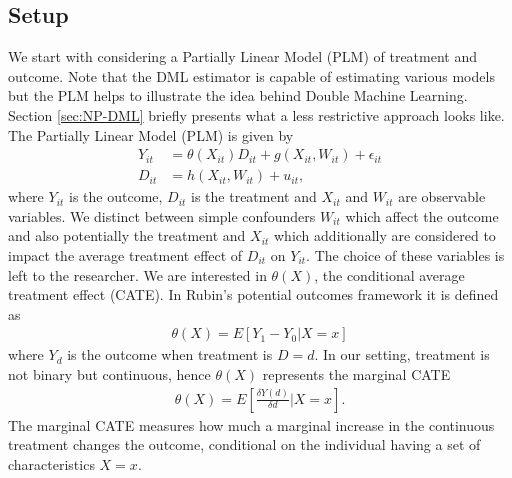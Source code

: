 \subsection{Setup} \label{sec:dml-idea}
We start with considering a Partially Linear Model (PLM) of treatment and outcome. Note that the DML estimator is capable of estimating various models but the PLM helps to illustrate the idea behind Double Machine Learning. Section \ref{sec:NP-DML} briefly presents what a less restrictive approach looks like. \\ 
The Partially Linear Model (PLM) is given by
\begin{align}
    Y_{it}&=\theta(X_{it})D_{it}+g(X_{it}, W_{it})+\epsilon_{it} \label{eq:plm1}\\
    D_{it}&=h(X_{it}, W_{it})+u_{it}, \label{eq:plm2}
\end{align}
where $Y_{it}$ is the outcome, $D_{it}$ is the treatment and $X_{it}$ and $W_{it}$ are observable variables. We distinct between simple confounders $W_{it}$ which affect the outcome and also potentially the treatment and $X_{it}$ which additionally are considered to impact the average treatment effect of $D_{it}$ on $Y_{it}$. The choice of these variables is left to the researcher. We are interested in $\theta(X)$, the conditional average treatment effect (CATE). In Rubin's potential outcomes framework it is defined as 
\begin{align*}
    \theta(X)=E[Y_1 - Y_0 | X=x]
\end{align*}
where $Y_d$ is the outcome when treatment is $D=d$. In our setting, treatment is not binary but continuous, hence $\theta(X)$ represents the marginal CATE
\begin{align*}
    \theta(X)=E\left[\frac{\delta Y(d)}{\delta d} \bigg| X=x\right].
\end{align*}
The marginal CATE measures how much a marginal increase in the continuous treatment changes the outcome, conditional on the individual having a set of characteristics $X=x$. 

